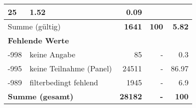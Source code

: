 \begin{longtable}{lXrrr}
       \num{25} &
       \num[round-mode=places,round-precision=2]{1,52} &
         \num[round-mode=places,round-precision=2]{0,09} \\
     \midrule
     \multicolumn{2}{l}{Summe (gültig)} &
       \textbf{\num{1641}} &
     \textbf{100} &
       \textbf{\num[round-mode=places,round-precision=2]{5,82}} \\
     \multicolumn{5}{l}{\textbf{Fehlende Werte}}\\
       -998 &
       keine Angabe &
         \num{85} &
        - &
         \num[round-mode=places,round-precision=2]{0,3} \\
       -995 &
       keine Teilnahme (Panel) &
         \num{24511} &
        - &
         \num[round-mode=places,round-precision=2]{86,97} \\
       -989 &
       filterbedingt fehlend &
         \num{1945} &
        - &
         \num[round-mode=places,round-precision=2]{6,9} \\
     \midrule
     \multicolumn{2}{l}{\textbf{Summe (gesamt)}} &
          \textbf{\num{28182}} &
        \textbf{-} &
        \textbf{100} \\
     \bottomrule
     \end{longtable}
     

